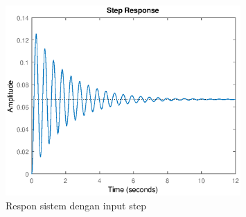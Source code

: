 \documentclass[../main.tex]{subfiles}
\begin{document}
                \begin{figure}[H]
                    \centering
                    \includegraphics[width =0.8\textwidth]{assets/image/validasi.eps}
                    \caption{Respon sistem dengan input step}
                    \label{respon_step_msd}
                \end{figure}
\end{document}
